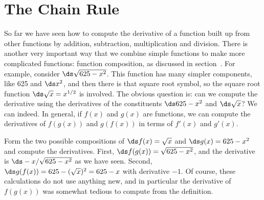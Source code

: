 \section{The Chain Rule}{}{}

So far we have seen how to compute the derivative of a function built
up from other functions by addition, subtraction, multiplication and
division. There is another very important way that we combine simple
functions to make more complicated functions: function
composition, as discussed in
section~. For example, consider $\ds
\sqrt{625-x^2}$. This function has many simpler components, like 625
and $\ds x^2$, and then there is that square root symbol, so the
square root function $\ds \sqrt{x}=x^{1/2}$ is involved. The obvious
question is: can we compute the derivative using the derivatives of
the constituents $\ds 625-x^2$ and $\ds \sqrt{x}$? We can indeed. In
general, if $f(x)$ and $g(x)$ are functions, we can compute the
derivatives of $f(g(x))$ and $g(f(x))$ in terms of $f'(x)$ and
$g'(x)$. 

\begin{example} Form the two possible compositions of $\ds f(x)=\sqrt{x}$ and
$\ds g(x)=625-x^2$ and compute the derivatives.  First, $\ds
f(g(x))=\sqrt{625-x^2}$, and the derivative is $\ds -x/\sqrt{625-x^2}$
as we have seen. Second, $\ds g(f(x))=625-(\sqrt{x})^2=625-x$ with
derivative $-1$. Of course, these calculations do not use anything
new, and in particular the derivative of $f(g(x))$ was somewhat
tedious to compute from the definition.
\end{example}

